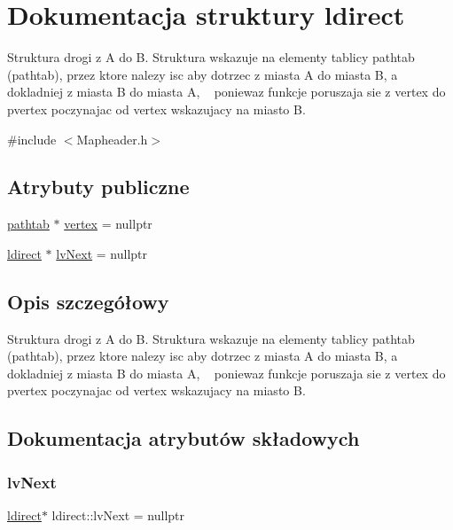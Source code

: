 \hypertarget{structldirect}{}\section{Dokumentacja struktury ldirect}
\label{structldirect}


Struktura drogi z A do B. Struktura wskazuje na elementy tablicy pathtab (pathtab), przez ktore nalezy isc aby dotrzec z miasta A do miasta B, a dokladniej z miasta B do miasta A, ~\newline
 poniewaz funkcje poruszaja sie z vertex do pvertex poczynajac od vertex wskazujacy na miasto B.  




{\ttfamily \#include $<$Mapheader.\+h$>$}

\subsection*{Atrybuty publiczne}
\begin{DoxyCompactItemize}
\item 
\mbox{\hyperlink{structpathtab}{pathtab}} $\ast$ \mbox{\hyperlink{structldirect_add97b81de6ff01404d84a910b25ee193}{vertex}} = nullptr
\item 
\mbox{\hyperlink{structldirect}{ldirect}} $\ast$ \mbox{\hyperlink{structldirect_a7e1ef7f8db92196f14e911a762b2a4c9}{lv\+Next}} = nullptr
\end{DoxyCompactItemize}


\subsection{Opis szczegółowy}
Struktura drogi z A do B. Struktura wskazuje na elementy tablicy pathtab (pathtab), przez ktore nalezy isc aby dotrzec z miasta A do miasta B, a dokladniej z miasta B do miasta A, ~\newline
 poniewaz funkcje poruszaja sie z vertex do pvertex poczynajac od vertex wskazujacy na miasto B. 

\subsection{Dokumentacja atrybutów składowych}
\mbox{\label{structldirect_a7e1ef7f8db92196f14e911a762b2a4c9}} 
\subsubsection{\texorpdfstring{lv\+Next}{lvNext}}
{\footnotesize\ttfamily \mbox{\hyperlink{structldirect}{ldirect}}$\ast$ ldirect\+::lv\+Next = nullptr}

